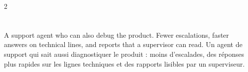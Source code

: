 \documentclass[10pt,a4paper]{article}
\begin{document}
\begin{paracol}{2}

\section*{}

{
A support agent who can also debug the product. Fewer escalations, faster answers on technical lines, and reports that a supervisor can read.
}
{
Un agent de support qui sait aussi diagnostiquer le produit : moins d'escalades, des réponses plus rapides sur les lignes techniques et des rapports lisibles par un superviseur.
}

\vspace{1em}

{\footnotesize
\href{https://github.com/AymanLyesri/CurriculumVitae}
{\faGithub\; }
}

\end{paracol}
\end{document}
